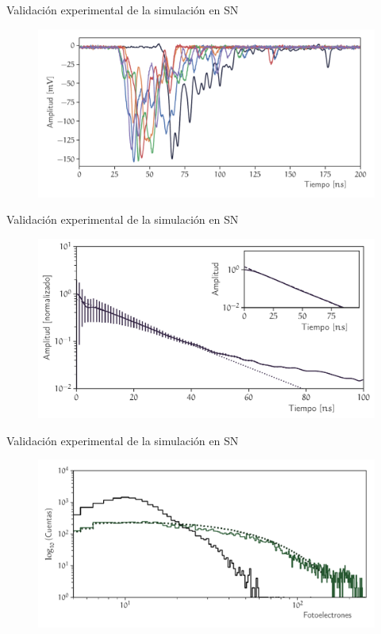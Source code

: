 \documentclass[spanish,aspectratio=169]{beamer}
\begin{document}
\begin{frame}{Validación experimental de la simulación en SN}

\begin{figure}
        \centering
        \includegraphics[width=\textwidth]{muon-pulse.pdf}
\end{figure}

\end{frame}

\begin{frame}{Validación experimental de la simulación en SN}

\begin{figure}
        \centering
        \includegraphics[width=\textwidth]{muons-tail-fit.pdf}
\end{figure}

\end{frame}

\begin{frame}{Validación experimental de la simulación en SN}

\begin{figure}
        \centering
        \includegraphics[width=\textwidth]{photons-number.pdf}
\end{figure}

\end{frame}
\end{document}
